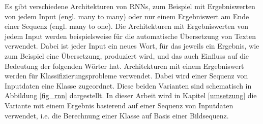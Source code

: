 Es gibt verschiedene Architekturen von \acp{RNN}, zum Beispiel mit Ergebniswerten von jedem Input (engl. many to many) oder nur einem Ergebniswert am Ende einer Sequenz (engl. many to one). Die Architekturen mit Ergebniswerten von jedem Input werden beispielsweise für die automatische Übersetzung von Texten verwendet. Dabei ist jeder Input ein neues Wort, für das jeweils ein Ergebnis, wie zum Beispiel eine Übersetzung, produziert wird, und das auch Einfluss auf die Bedeutung der folgenden Wörter hat. Architekturen mit einem Ergebniswert werden für Klassifizierungsprobleme verwendet. Dabei wird einer Sequenz von Inputdaten eine Klasse zugeordnet. Diese beiden Varianten sind schematisch in Abbildung \ref{fig_rnn} dargestellt. In dieser Arbeit wird in Kapitel \ref{umsetzung} die Variante mit einem Ergebnis basierend auf einer Sequenz von Inputdaten verwendet, i.e. die Berechnung einer Klasse auf Basis einer Bildsequenz.

